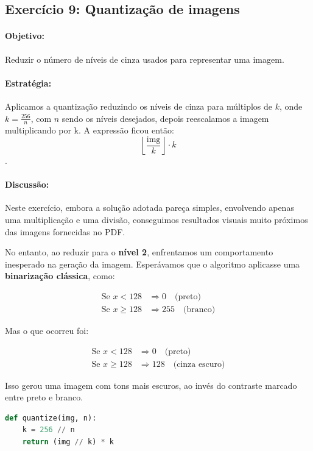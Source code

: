 \documentclass[12pt,a4paper]{report}
\begin{document}
\subsection{Exercício 9: Quantização de imagens}
\paragraph{Objetivo:} 
Reduzir o número de níveis de cinza usados para representar uma imagem.

\paragraph{Estratégia:} 
Aplicamos a quantização reduzindo os níveis de cinza para múltiplos de $k$, onde $k = \frac{256}{n}$, com $n$ sendo os níveis desejados, depois reescalamos a imagem multiplicando por k. A expressão ficou então: 
\[
\left\lfloor \frac{\text{img}}{k} \right\rfloor \cdot k
\].

\paragraph{Discussão:} 
Neste exercício, embora a solução adotada pareça simples, envolvendo apenas uma multiplicação e uma divisão, conseguimos resultados visuais muito próximos das imagens fornecidas no PDF.

No entanto, ao reduzir para o \textbf{nível 2}, enfrentamos um comportamento inesperado na geração da imagem. Esperávamos que o algoritmo aplicasse uma \textbf{binarização clássica}, como:

\begin{align*}
\text{Se } x < 128 &\Rightarrow 0 \quad \text{(preto)} \\
\text{Se } x \geq 128 &\Rightarrow 255 \quad \text{(branco)}
\end{align*}

Mas o que ocorreu foi:

\begin{align*}
  \text{Se } x < 128 &\Rightarrow 0 \quad \text{(preto)} \\
  \text{Se } x \geq 128 &\Rightarrow 128 \quad \text{(cinza escuro)}
\end{align*}

Isso gerou uma imagem com tons mais escuros, ao invés do contraste marcado entre preto e branco.


\begin{lstlisting}[language=Python, caption={Algoritmo utilizado para quantização das imagens}]
def quantize(img, n):
    k = 256 // n
    return (img // k) * k
\end{lstlisting}
\end{document}
